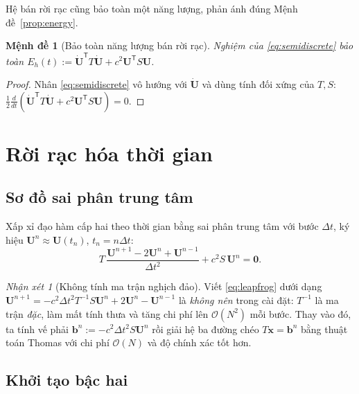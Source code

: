 \documentclass[11pt,a4paper]{article}
\theoremstyle{plain}
\newtheorem{proposition}[theorem]{Mệnh đề}
\theoremstyle{definition}
\theoremstyle{remark}
\newtheorem{remark}[theorem]{Nhận xét}
\newcommand{\dt}{\Delta t}
\newcommand{\Uvec}{\bm{U}}
\begin{document}
Hệ bán rời rạc cũng bảo toàn một năng lượng, phản ánh đúng
Mệnh đề~\ref{prop:energy}.

\begin{proposition}[Bảo toàn năng lượng bán rời rạc]
\label{prop:semi-energy}
Nghiệm của \eqref{eq:semidiscrete} bảo toàn
$E_{h}(t) := \dot{\Uvec}^{\mathsf{T}}T\dot{\Uvec}
           + c^{2}\Uvec^{\mathsf{T}}S\Uvec$.
\end{proposition}

\begin{proof}
Nhân \eqref{eq:semidiscrete} vô hướng với $\dot{\Uvec}$ và dùng tính đối xứng
của $T,S$:
$\tfrac{1}{2}\tfrac{d}{dt}
 (\dot{\Uvec}^{\mathsf{T}}T\dot{\Uvec} + c^{2}\Uvec^{\mathsf{T}}S\Uvec) = 0$.
\end{proof}

\section{Rời rạc hóa thời gian}
\label{sec:thoigian}

\subsection{Sơ đồ sai phân trung tâm}

Xấp xỉ đạo hàm cấp hai theo thời gian bằng sai phân trung tâm với bước
$\dt$, ký hiệu $\Uvec^{n} \approx \Uvec(t_{n})$, $t_{n} = n\dt$:
\begin{equation}
\label{eq:leapfrog}
  T\,\frac{\Uvec^{n+1} - 2\Uvec^{n} + \Uvec^{n-1}}{\dt^{2}}
  + c^{2}S\,\Uvec^{n} = \bm{0}.
\end{equation}

\begin{remark}[Không tính ma trận nghịch đảo]
\label{rem:noinverse}
Viết \eqref{eq:leapfrog} dưới dạng
$\Uvec^{n+1} = -c^{2}\dt^{2}T^{-1}S\Uvec^{n} + 2\Uvec^{n} - \Uvec^{n-1}$ là
\emph{không nên} trong cài đặt: $T^{-1}$ là ma trận \emph{đặc}, làm mất tính
thưa và tăng chi phí lên $\mathcal{O}(N^{2})$ mỗi bước. Thay vào đó, ta tính
vế phải $\bm{b}^{n} := -c^{2}\dt^{2}S\Uvec^{n}$ rồi giải hệ ba đường chéo
$T\bm{x} = \bm{b}^{n}$ bằng thuật toán Thomas với chi phí
$\mathcal{O}(N)$ và độ chính xác tốt hơn.
\end{remark}

\subsection{Khởi tạo bậc hai}
\end{document}
